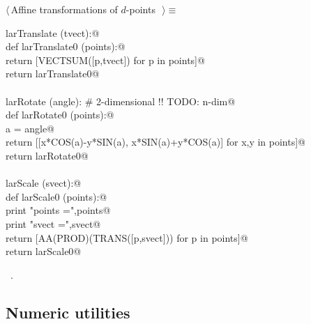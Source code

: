 \documentclass[11pt,oneside]{article}	%
\begin{document}
\begin{flushleft} \small \label{scrap51}
$\langle\,$Affine transformations of $d$-points\nobreak\ {\footnotesize {}}$\,\rangle\equiv$
\vspace{-1ex}
\begin{list}{}{} \item
\mbox{}\verb@def larTranslate (tvect):@\\
\mbox{}\verb@   def larTranslate0 (points):@\\
\mbox{}\verb@      return [VECTSUM([p,tvect]) for p in points]@\\
\mbox{}\verb@   return larTranslate0@\\
\mbox{}\verb@@\\
\mbox{}\verb@def larRotate (angle):     # 2-dimensional !! TODO: n-dim@\\
\mbox{}\verb@   def larRotate0 (points):@\\
\mbox{}\verb@      a = angle@\\
\mbox{}\verb@      return [[x*COS(a)-y*SIN(a), x*SIN(a)+y*COS(a)] for x,y in points]@\\
\mbox{}\verb@   return larRotate0@\\
\mbox{}\verb@@\\
\mbox{}\verb@def larScale (svect):@\\
\mbox{}\verb@   def larScale0 (points):@\\
\mbox{}\verb@      print "\n points =",points@\\
\mbox{}\verb@      print "\n svect =",svect@\\
\mbox{}\verb@      return [AA(PROD)(TRANS([p,svect])) for p in points]@\\
\mbox{}\verb@   return larScale0@\\
\mbox{}\verb@@{\NWsep}
\end{list}
\vspace{-1ex}
\footnotesize\addtolength{\baselineskip}{-1ex}
\begin{list}{}{\setlength{\itemsep}{-\parsep}\setlength{\itemindent}{-\leftmargin}}
\item \NWtxtMacroRefIn\ .
\end{list}
\end{flushleft}



\subsection{Numeric utilities}
\end{document}
